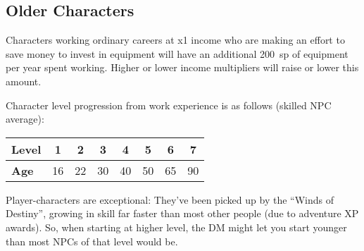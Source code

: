 
%
\subsection{Older Characters}

Characters working ordinary careers at x1 income who are making an effort
to save money to invest in equipment will have an additional 200~sp of
equipment per year spent working. Higher or lower income multipliers will
raise or lower this amount.


Character level progression from work experience is as follows (skilled NPC
average):

\begin{tabular}{|l||c|c|c|c|c|c|c|}\hline
\textbf{Level} & 1 & 2 & 3 & 4 & 5 & 6 & 7 \\ \hline
\textbf{Age} & 16 & 22 & 30 & 40 & 50 & 65 & 90 \\ \hline
\end{tabular}

Player-characters are exceptional: They've been picked up by the ``Winds
of Destiny'', growing in skill far faster than most other people (due to
adventure XP awards). So, when starting at higher level, the DM might let
you start younger than most NPCs of that level would be.

%
